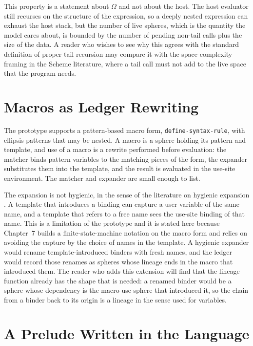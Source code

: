 \documentclass[11pt,oneside]{report}
\theoremstyle{plain}
\theoremstyle{definition}
\theoremstyle{remark}
\newcommand{\code}[2][Python]{}
\begin{document}
\code{ex_lisp_call}

This property is a statement about $\Omega$ and not about the host. The host evaluator still recurses on the structure of the expression, so a deeply nested expression can exhaust the host stack, but the number of live spheres, which is the quantity the model cares about, is bounded by the number of pending non-tail calls plus the size of the data. A reader who wishes to see why this agrees with the standard definition of proper tail recursion may compare it with the space-complexity framing in the Scheme literature, where a tail call must not add to the live space that the program needs.

\section{Macros as Ledger Rewriting}

The prototype supports a pattern-based macro form, \texttt{define-syntax-rule}, with ellipsis patterns that may be nested. A macro is a sphere holding its pattern and template, and use of a macro is a rewrite performed before evaluation: the matcher binds pattern variables to the matching pieces of the form, the expander substitutes them into the template, and the result is evaluated in the use-site environment. The matcher and expander are small enough to list.

\code{ex_lisp_macro}

The expansion is not hygienic, in the sense of the literature on hygienic expansion \cite{kohlbecker86}. A template that introduces a binding can capture a user variable of the same name, and a template that refers to a free name sees the use-site binding of that name. This is a limitation of the prototype and it is stated here because Chapter~7 builds a finite-state-machine notation on the macro form and relies on avoiding the capture by the choice of names in the template. A hygienic expander would rename template-introduced binders with fresh names, and the ledger would record those renames as spheres whose lineage ends in the macro that introduced them. The reader who adds this extension will find that the lineage function already has the shape that is needed: a renamed binder would be a sphere whose dependency is the macro-use sphere that introduced it, so the chain from a binder back to its origin is a lineage in the sense used for variables.

\section{A Prelude Written in the Language}
\end{document}
